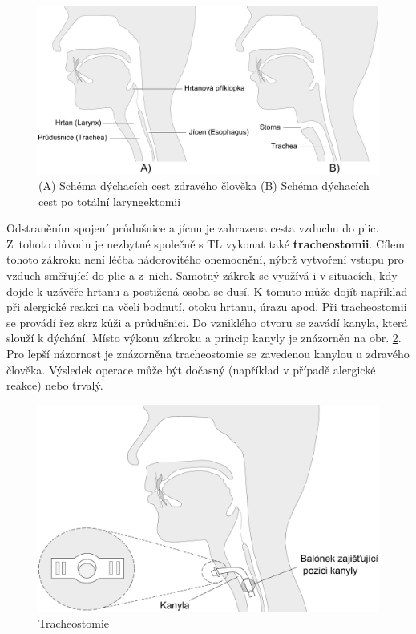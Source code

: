 \begin{figure}[htb]
  \begin{center}
    \def\svgwidth{0.9\linewidth}
    \includegraphics[width=0.9\linewidth]{ch3-cause/figures/dychaci-cesty-tl}
    \caption[Schéma dýchacích cest zdravého člověka (A) pacienta po totální laryngektomii (B)]{(A) Schéma dýchacích cest zdravého člověka (B) Schéma dýchacích cest po totální laryngektomii}
    \label{fig:cause:desease:laryngectomy}
  \end{center}
\end{figure}

Odstraněním spojení průdušnice a jícnu je zahrazena cesta vzduchu do plic.
Z~tohoto důvodu je nezbytné společně s TL vykonat také \textbf{tracheostomii}.
Cílem tohoto zákroku není léčba nádorovitého onemocnění, nýbrž vytvoření
vstupu pro vzduch směřující do plic a z~nich. Samotný zákrok se využívá i v
situacích, kdy dojde k uzávěře hrtanu a postižená osoba se dusí. K tomuto může
dojít například při alergické reakci na včelí bodnutí, otoku hrtanu, úrazu
apod. Při tracheostomii se provádí řez skrz kůži a průdušnici. Do vzniklého
otvoru se zavádí kanyla, která slouží k dýchání. Místo výkonu zákroku a
princip kanyly je znázorněn na obr. \ref{fig:cause:desease:tracheostomy}. Pro
lepší názornost je znázorněna tracheostomie se zavedenou kanylou u zdravého
člověka. Výsledek operace může být dočasný (například v případě alergické
reakce) nebo trvalý.

\begin{figure}[htb]
  \begin{center}
    \def\svgwidth{0.9\linewidth}
    \includegraphics[width=0.9\linewidth]{ch3-cause/figures/tracheostomie}
    \caption[Tracheostomie]{Tracheostomie}
    \label{fig:cause:desease:tracheostomy}
  \end{center}
\end{figure}

